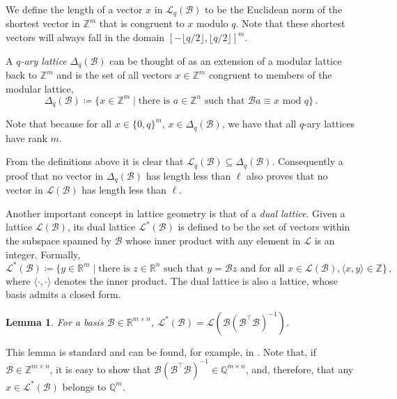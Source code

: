 \documentclass[11pt]{article}
\theoremstyle{definition}
\theoremstyle{plain}
\newtheorem{lemma}[definition]{Lemma}
\theoremstyle{remark}
\newcommand{\LL}{\mathcal{L}}
\newcommand{\cB}{\mathcal{B}}
\newcommand{\bZ}{\mathbb{Z}}
\newcommand{\bR}{\mathbb{R}}
\begin{document}
We define the length of a vector $x$ in $\LL_q(\cB)$ to be the Euclidean norm of the shortest vector in $\bZ^m$ that is congruent to $x$ modulo $q$. Note that these shortest vectors will always fall in the domain ${[-\lfloor q/2 \rfloor, \lfloor {q}/{2} \rfloor]^m}$.

A \emph{$q$-ary lattice} $\Delta_q(\mathcal{B})$ can be thought of as an extension of a modular lattice back to $\bZ^m$ and is the set of all vectors $x\in\mathbb{Z}^m$ congruent to members of the modular lattice,
\[ \Delta_q(\mathcal{B}) \coloneqq \{x \in \mathbb{Z}^m \mid \text{there is } a \in \mathbb{Z}^{n}\text{ such that } \mathcal{B}a \equiv x \text{ mod } q\} \,.  \]

Note that because for all $x \in\{0,q\}^m$,  $x \in \Delta_q(\mathcal{B})$, we have that all $q$-ary lattices have rank $m$.

From the definitions above it is clear that $\LL_q(\cB) \subseteq \Delta_q(\cB)$. Consequently a proof that no vector in $\Delta_q(\cB)$ has length less than $\ell$ also proves that no vector in $\LL(\cB)$ has length less than $\ell$.

Another important concept in lattice geometry is that of a \emph{dual lattice}. Given a lattice $\mathcal{L}(\mathcal{B})$, its dual lattice $\mathcal{L}^*(\mathcal{B})$ is defined to be the set of vectors within the subspace spanned by $\mathcal{B}$ whose inner product with any element in $\mathcal{L}$ is an integer. Formally,
 \begin{equation*}
     \mathcal{L}^*(\mathcal{B}) \coloneqq \{ y \in \mathbb{R}^m \mid \text{there is } z \in \mathbb{R}^n \text{ such that } y=\mathcal{B} z  \text{ and for all }x \in \mathcal{L}(\mathcal{B}), \langle x, y\rangle \in \mathbb{Z}\}\,,
 \end{equation*}
 where $\langle \cdot, \cdot \rangle$ denotes the inner product. The dual lattice is also a lattice, whose basis admits a closed form.
\begin{lemma}
\label{lem:dual-basis}
For a basis $\mathcal{B} \in \bR^{m\times n}$, $\mathcal{L}^*(\mathcal{B}) = \mathcal{L}(\mathcal{B}(\mathcal{B}^\intercal \mathcal{B})^{-1})$.
\end{lemma}
This lemma is standard and can be found, for example, in \cite{Micciancio2011}. Note that, if $\mathcal{B}\in \mathbb{Z}^{m \times n}$, it is easy to show that $ \mathcal{B}(\mathcal{B}^\intercal \mathcal{B})^{-1} \in \mathbb{Q}^{m \times n}$, and, therefore, that any $x \in \mathcal{L}^*(\mathcal{B})$ belongs to $\mathbb{Q}^m$. 
\end{document}
